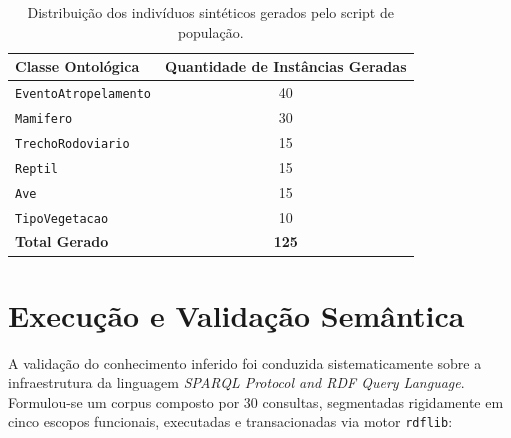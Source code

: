 \documentclass[10pt,conference]{IEEEtran}
\begin{document}
\begin{table}[h]
\centering
\caption{Distribuição dos indivíduos sintéticos gerados pelo script de população.}
\label{tab:distribuicao}
\begin{tabular}{@{}lc@{}}
\toprule
\textbf{Classe Ontológica} & \textbf{Quantidade de Instâncias Geradas} \\ \midrule
\texttt{EventoAtropelamento} & 40 \\
\texttt{Mamifero} & 30 \\
\texttt{TrechoRodoviario} & 15 \\
\texttt{Reptil} & 15 \\
\texttt{Ave} & 15 \\
\texttt{TipoVegetacao} & 10 \\ \midrule
\textbf{Total Gerado} & \textbf{125} \\ \bottomrule
\end{tabular}
\end{table}

\section{Execução e Validação Semântica}

A validação do conhecimento inferido foi conduzida sistematicamente sobre a infraestrutura da linguagem \textit{SPARQL Protocol and RDF Query Language}. Formulou-se um corpus composto por 30 consultas, segmentadas rigidamente em cinco escopos funcionais, executadas e transacionadas via motor \texttt{rdflib}:
\end{document}
